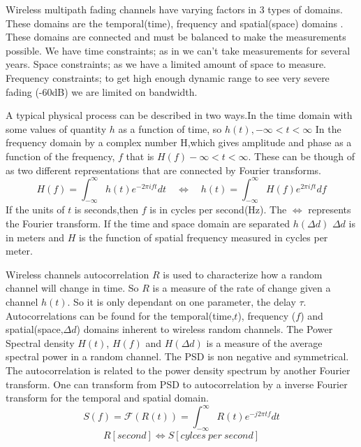Wireless multipath fading channels have varying factors in 3 types of domains. These domains are the temporal(time), frequency and spatial(space) domains \citep[p. 40-42]{stochasticWirelessChan}. These domains are connected and must be balanced to make the measurements possible. We have time constraints; as in we can't take measurements for several years. Space constraints; as we have a limited amount of space to measure. Frequency constraints; to get high enough dynamic range to see very severe fading (-60dB) we are limited on bandwidth.

A typical physical process can be described in two ways.In the time domain with some values of quantity $h$ as a function of time, so $h(t), -\infty < t < \infty$ In the frequency domain by a complex number H,which gives amplitude and phase as a function of the frequency, $f$ that is $H(f) -\infty < t < \infty$. These can be though of as two different representations that are connected by Fourier transforms.
\begin{equation}
H(f)=\int_{- \infty}^{\infty}h(t)e^{-2\pi ift} dt \quad \Leftrightarrow \quad
h(t)=\int_{- \infty}^{\infty}H(f)e^{2\pi ift} df
\end{equation}
If the units of $t$ is seconds,then $f$ is in cycles per second(Hz). The $\Leftrightarrow$ represents the Fourier transform.
If the time and space domain are separated  $h(\Delta d)$ $\Delta d$ is in meters and $H$ is the function of spatial frequency measured in cycles per meter. \citep{FTandCORR}

Wireless channels autocorrelation $R$ is used to characterize how a random channel will change in time. So $R$ is a measure of the rate of change given a channel $h(t)$. So it is only dependant on one parameter, the delay $\tau$. Autocorrelations can be found for the temporal(time,$t$), frequency ($f$) and spatial(space,$\Delta d$) domains inherent to wireless random channels. The Power Spectral density $H(t)$, $H(f)$ and $H(\Delta d)$ is a measure of the average spectral power in a random channel. The PSD is non negative and symmetrical. The autocorrelation is related to the power density spectrum by another Fourier transform. One can transform from PSD to autocorrelation by a inverse Fourier transform for the temporal and spatial domain. 
\begin{equation}
S(f) = \mathcal{F}(R(t)) = \int_{- \infty}^{\infty} R(t)e^{-j2 \pi t f} d t
\end{equation}
\begin{equation}
R [second] \Leftrightarrow
S [cylces \ per \ second]
\end{equation}

